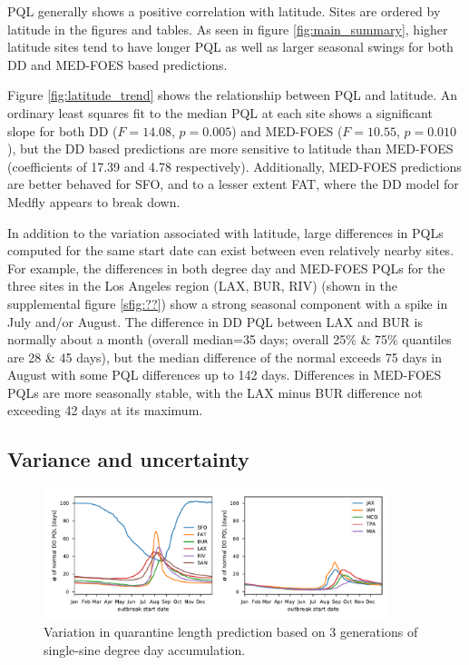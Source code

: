 \documentclass[10pt,a4paper,twocolumn]{article}
\begin{document}
PQL generally shows a positive correlation with latitude\cite{??}.
Sites are ordered by latitude in the figures and tables.
As seen in figure \ref{fig:main_summary}, higher latitude sites tend to have longer PQL 
as well as larger seasonal swings for both DD and MED-FOES based predictions.

Figure \ref{fig:latitude_trend} shows the relationship between PQL and latitude.
An ordinary least squares fit to the median PQL at each site shows a significant slope for
both DD ($F{=}14.08$, $p{=}0.005$) and MED-FOES ($F{=}10.55$, $p{=}0.010$), but
the DD based predictions are more sensitive to latitude than MED-FOES
(coefficients of 17.39 and 4.78 respectively).
Additionally, MED-FOES predictions are better behaved for SFO, and to a lesser extent FAT, 
where the DD model for Medfly appears to break down.

In addition to the variation associated with latitude, 
large differences in PQLs computed for the same start date 
can exist between even relatively nearby sites.
For example, the differences in both degree day and MED-FOES PQLs 
for the three sites in the Los Angeles region (LAX, BUR, RIV) 
(shown in the supplemental figure \ref{sfig:??})
show a strong seasonal component with a spike in July and/or August.
The difference in DD PQL between LAX and BUR is normally about a month
(overall median=35 days; overall 25\% \& 75\% quantiles are 28 \& 45 days), 
but the median difference of the normal exceeds 75 days in August with some 
PQL differences up to 142 days.
Differences in MED-FOES PQLs are more seasonally stable, 
with the LAX minus BUR difference not exceeding 42 days at its maximum.


\subsection*{Variance and uncertainty}

\begin{figure}[ht!]
\centering
\includegraphics[width=0.9\textwidth]{figs/fig_BMDD_variation.pdf}
\caption{\label{fig:DD_variation_summary}Variation in quarantine length prediction 
based on 3 generations of single-sine degree day accumulation.}
\end{figure}
\end{document}
